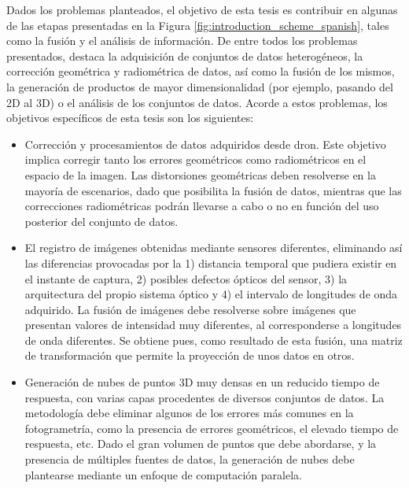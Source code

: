 Dados los problemas planteados, el objetivo de esta tesis es contribuir en algunas de las etapas presentadas en la Figura \ref{fig:introduction_scheme_spanish}, tales como la fusión y el análisis de información. De entre todos los problemas presentados, destaca la adquisición de conjuntos de datos heterogéneos, la corrección geométrica y radiométrica de datos, así como la fusión de los mismos, la generación de productos de mayor dimensionalidad (por ejemplo, pasando del 2D al 3D) o el análisis de los conjuntos de datos. Acorde a estos problemas, los objetivos específicos de esta tesis son los siguientes:
\begin{itemize}
    \item Corrección y procesamientos de datos adquiridos desde dron. Este objetivo implica corregir tanto los errores geométricos como radiométricos en el espacio de la imagen. Las distorsiones geométricas deben resolverse en la mayoría de escenarios, dado que posibilita la fusión de datos, mientras que las correcciones radiométricas podrán llevarse a cabo o no en función del uso posterior del conjunto de datos. 
    \item El registro de imágenes obtenidas mediante sensores diferentes, eliminando así las diferencias provocadas por la 1) distancia temporal que pudiera existir en el instante de captura, 2) posibles defectos ópticos del sensor, 3) la arquitectura del propio sistema óptico y 4) el intervalo de longitudes de onda adquirido. La fusión de imágenes debe resolverse sobre imágenes que presentan valores de intensidad muy diferentes, al corresponderse a longitudes de onda diferentes. Se obtiene pues, como resultado de esta fusión, una matriz de transformación que permite la proyección de unos datos en otros.
    \item Generación de nubes de puntos 3D muy densas en un reducido tiempo de respuesta, con varias capas procedentes de diversos conjuntos de datos. La metodología debe eliminar algunos de los errores más comunes en la fotogrametría, como la presencia de errores geométricos, el elevado tiempo de respuesta, etc. Dado el gran volumen de puntos que debe abordarse, y la presencia de múltiples fuentes de datos, la generación de nubes debe plantearse mediante un enfoque de computación paralela.

\end{itemize}
